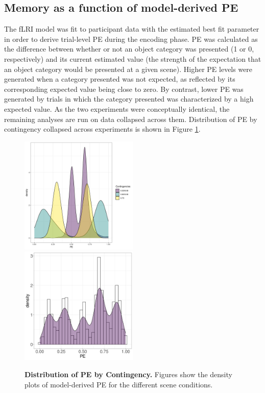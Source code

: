 \documentclass[a4paper,12pt]{article}
\begin{document}
\subsection{Memory as a function of model-derived PE}
The fLRI model was fit to participant data with the estimated best fit parameter in order to derive trial-level PE during the encoding phase. PE was calculated as the difference between whether or not an object category was presented (1 or 0, respectively) and its current estimated value (the strength of the expectation that an object category would be presented at a given scene). Higher PE levels were generated when a category presented was not expected, as reflected by its corresponding expected value being close to zero. By contrast, lower PE was generated by trials in which the category presented was characterized by a high expected value. As the two experiments were conceptually identical, the remaining analyses are run on data collapsed across them. Distribution of PE by contingency collapsed across experiments is shown in Figure \ref{fig:PE_distr}. 

\begin{figure}[ht!]
{\includegraphics[width=0.5\textwidth]{figures/PE_instr_distr.exp1.exp2.png}} \hfill
{\includegraphics[width=0.5\textwidth]{figures/PE_instr_distrNOscene.exp1.exp2.png}}
\caption{\textbf{Distribution of PE by Contingency.} Figures show the density plots of model-derived PE for the different scene conditions.  }
\label{fig:PE_distr}
\end{figure}
\end{document}

